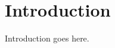 \documentclass[aps,prl,twocolumn,groupedaddress]{revtex4-1}
\begin{document}


\section{Introduction}

Introduction goes here.
\end{document}
